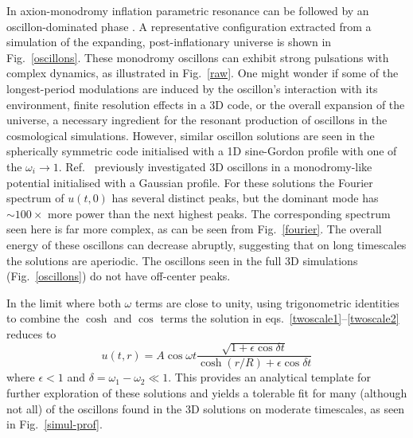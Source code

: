 \documentclass[%
reprint,
superscriptaddress,
amsmath,amssymb,
aps,
prl,
floatfix,
nofootinbib
]{revtex4-1}
\begin{document}

\medbreak{} In  axion-monodromy inflation  \cite{Silverstein:2008sg,McAllister:2008hb,Flauger:2009ab} parametric resonance can be followed by an oscillon-dominated phase  \cite{Amin:2011hj,Zhou:2013tsa}. A  representative configuration  extracted from a simulation of the expanding, post-inflationary universe \cite{Easther:2010qz} is shown in Fig.~\ref{oscillons}. These monodromy oscillons can exhibit strong pulsations with  complex dynamics, as illustrated in Fig.~\ref{raw}.  One might wonder if some of the longest-period modulations are induced by the oscillon's interaction with its environment,  finite resolution effects in a 3D code, or the overall expansion of the universe, a necessary  ingredient for the resonant production of oscillons in the cosmological simulations. However, similar oscillon solutions are seen in the spherically symmetric code initialised with a 1D sine-Gordon profile with one of the $\omega_i\to1$. Ref.~\cite{Salmi:2012ta} previously investigated 3D oscillons in a monodromy-like potential initialised with a Gaussian profile. For these solutions the Fourier spectrum of $u(t,0)$ has several distinct peaks, but the dominant mode has $\sim 100\times$ more power than the next highest peaks. The corresponding spectrum seen here is far more complex,  as can be seen from  Fig.~\ref{fourier}. The overall energy of these oscillons can decrease abruptly, suggesting that on long timescales the solutions are aperiodic. The oscillons seen in the full 3D simulations (Fig.~\ref{oscillons}) do not have off-center peaks.  

In the limit where  both $\omega$ terms are  close to unity, using trigonometric identities to combine the $\cosh$ and $\cos$ terms the solution in eqs.~\ref{twoscale1}--\ref{twoscale2} reduces to
%
\begin{equation} \label{fitprof}
  u(t,r) = A\cos\omega t \frac{\sqrt{1+\epsilon \cos \delta t}}{\cosh(r/R) + \epsilon \cos \delta t}
\end{equation}
where $\epsilon<1$ and $\delta = \omega_1-\omega_2 \ll 1$. This provides an analytical template for further exploration of these solutions and yields a tolerable fit for many (although not all) of the oscillons found in the 3D solutions on moderate timescales, as seen in Fig.~\ref{simul-prof}. 
\end{document}
